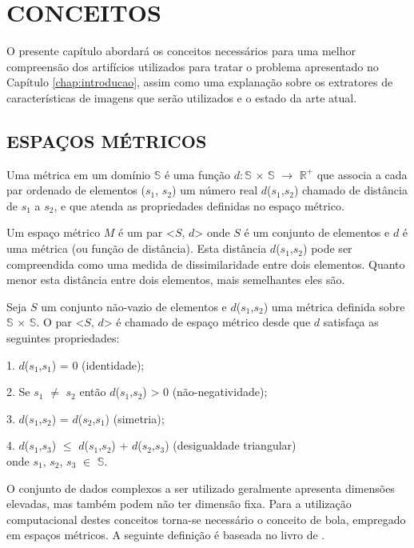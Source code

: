 \chapter{CONCEITOS}
\label{chap:conceitos}
O presente capítulo abordará os conceitos necessários para uma melhor compreensão dos artifícios utilizados para tratar o problema apresentado no Capítulo \ref{chap:introducao}, assim como uma
explanação sobre os extratores de características de imagens que serão utilizados e o estado da arte atual.

\section{ESPAÇOS MÉTRICOS}
\label{sec:espmet}
Uma métrica em um domínio $\mathbb{S}$ é uma função $d:\mathbb{S}$ $\times$ $\mathbb{S}$ $\rightarrow$ $\mathbb{R^{+}}$ que associa a cada par 
ordenado de elementos ($s_1$, $s_2$) um número real $d$($s_1$,$s_2$) chamado de distância de $s_1$ a $s_2$, e que atenda
as propriedades definidas no espaço métrico\cite{Lima1977}.\par
Um espaço métrico $M$ é um par <$S$, $d$> onde $S$ é um conjunto de elementos e $d$ é uma métrica
(ou função de distância). Esta distância $d$($s_1$,$s_2$) pode ser compreendida como uma medida de dissimilaridade entre dois elementos.
Quanto menor esta distância entre dois elementos, mais semelhantes eles são.
\begin{mydef}
 \label{def:espmet}
  Seja $S$ um conjunto não-vazio de elementos e $d$($s_1$,$s_2$) uma métrica definida sobre $\mathbb{S}$ $\times$ $\mathbb{S}$.
   O par <$S$, $d$> é chamado de espaço métrico desde que $d$ satisfaça as seguintes propriedades:\par
1. $d$($s_1$,$s_1$) = 0 (identidade);\par
2. Se $s_1$ $\neq$ $s_2$ ent\~ao $d$($s_1$,$s_2$) > 0 (n\~ao-negatividade);\par
3. $d$($s_1$,$s_2$) = $d$($s_2$,$s_1$) (simetria);\par
4. $d$($s_1$,$s_3$) $\leq$ $d$($s_1$,$s_2$) + $d$($s_2$,$s_3$) (desigualdade triangular)\\
onde $s_1$, $s_2$, $s_3$ $\in$ $\mathbb{S}$.
\end{mydef}
O conjunto de dados complexos a ser utilizado geralmente apresenta dimensões elevadas, mas também podem não ter dimensão fixa. Para a utilização computacional destes conceitos torna-se necessário o conceito de bola,
empregado em espaços métricos. A seguinte definição é baseada no livro de \cite{Shirali2005}.

